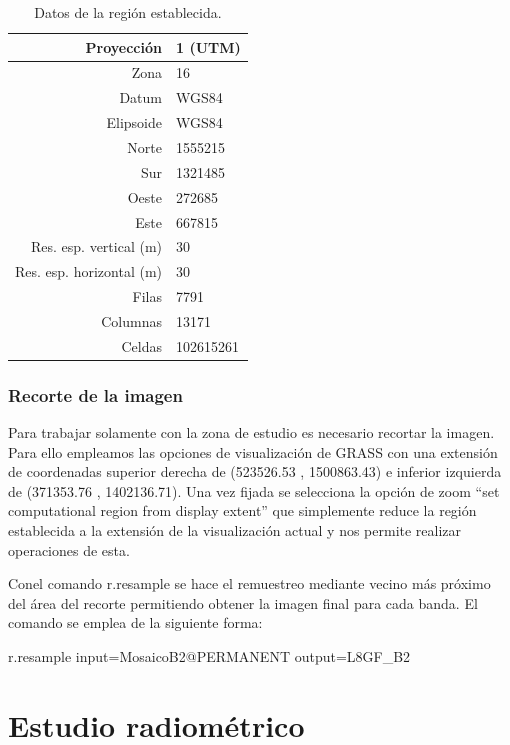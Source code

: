 \begin{table}
	\centering
	\caption[Datos de la región establecida en GRASS]{Datos de la región establecida.}
	\begin{tabular}{|r|l|}
	\hline
	Proyección & 1 (UTM) \\
	\hline
	Zona & 16 \\
	\hline
	Datum & WGS84 \\
	\hline
	Elipsoide & WGS84 \\
	\hline
	Norte & 1555215 \\
	\hline
	Sur & 1321485 \\
	\hline
	Oeste & 272685 \\
	\hline
	Este & 667815 \\
	\hline
	Res. esp. vertical (m) & 30 \\
	\hline
	Res. esp. horizontal (m) & 30 \\
	\hline
	Filas & 7791 \\
	\hline
	Columnas & 13171 \\
	\hline
	Celdas & 102615261 \\
	\hline
	\end{tabular}
	\label{tab:region}
\end{table}

\subsubsection{Recorte de la imagen}
Para trabajar solamente con la zona de estudio es necesario recortar la imagen. Para ello empleamos las opciones de visualización de GRASS con una extensión de coordenadas superior derecha de (523526.53 , 1500863.43) e inferior izquierda de (371353.76 , 1402136.71). Una vez fijada se selecciona la opción de zoom ``set computational region from display extent'' que simplemente reduce la región establecida a la extensión de la visualización actual y nos permite realizar operaciones de esta.\Sep

Conel comando r.resample se hace el remuestreo mediante vecino más próximo del área del recorte permitiendo obtener la imagen final para cada banda. El comando se emplea de la siguiente forma:

\begin{center}
\begin{boxedverbatim}
	r.resample input=MosaicoB2@PERMANENT output=L8GF_B2
\end{boxedverbatim}
\end{center}

\section{Estudio radiométrico}